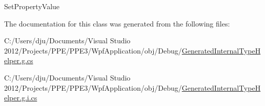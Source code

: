 Set\-Property\-Value 



The documentation for this class was generated from the following files\-:\begin{DoxyCompactItemize}
\item 
C\-:/\-Users/dju/\-Documents/\-Visual Studio 2012/\-Projects/\-P\-P\-E/\-P\-P\-E3/\-Wpf\-Application/obj/\-Debug/\hyperlink{_generated_internal_type_helper_8g_8cs}{Generated\-Internal\-Type\-Helper.\-g.\-cs}\item 
C\-:/\-Users/dju/\-Documents/\-Visual Studio 2012/\-Projects/\-P\-P\-E/\-P\-P\-E3/\-Wpf\-Application/obj/\-Debug/\hyperlink{_generated_internal_type_helper_8g_8i_8cs}{Generated\-Internal\-Type\-Helper.\-g.\-i.\-cs}\end{DoxyCompactItemize}
